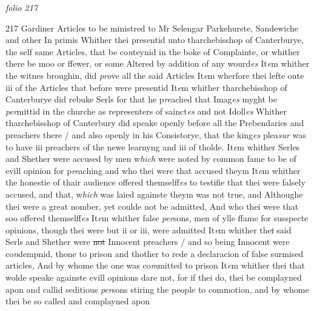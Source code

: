 \documentclass[12pt, a4paper]{book}
\begin{document}
\textit{folio 217}



{\color{Mahogany}217} Gardiner 
				\marginpar[\vspace{0.5cm}{\textcolor{Gray}{Gardiner}}]{}
			 Articles to be ministred to Mr Selengar Parkehurste, Sandewiche and other In primis Whither thei presentid unto tharchebisshop of Canterburye, the self same Articles, that be co\textit{n}teynid in the boke of Complainte, or whither there be moo or ffewer, or  some Altered by addition of any wourd\textit{es} It\textit{e}m whither the witnes broughin, did \textit{pro}ve all the said Articles It\textit{e}m wherfore thei lefte oute iii of the Articles that before were presentid It\textit{e}m whither tharchebisshop of Canterburye did rebuke Serls for that he p\textit{re}ached that Imag\textit{es} myght be \textit{per}mittid in the churche as representers of sainct\textit{es} and not Idoll\textit{es} Whither tharchebisshop of Canterbury did speake openly  before all the Prebendaries and preachers there / and also  openly in his Consistorye, that the king\textit{es} plea\textit{sur} was to have  iii preachers of the newe learnyng and iii of tholde. It\textit{e}m whither Serles and Shether were accused by men w\textit{hich} were noted by common fame to be of evill opinion for p\textit{re}aching and who thei were that accused theym It\textit{e}m whither the honestie of thair audience offered themselff\textit{es} to testifie that thei were falsely accused, and that, w\textit{hich}  was laied againste theym was not true, and Althoughe thei were a great nomber, yet coulde not be admitted, And who thei were that soo offered themselff\textit{es} It\textit{e}m whither false \textit{per}sons, men of ylle ffame for susspecte opinions, though thei were but ii or iii, were admitted It\textit{e}m whither the\sout{i}
               said Serls and Shether
			 were \sout{not} Innocent preachers / and so being Innocent were co\textit{n}dempnid, thone to prison and thother to rede a declaracion of false surmised articles, And by whome the one was co\textit{m}mitted to prison It\textit{e}m whither thei that wolde speake againste evill opinions dare not, for if thei do, thei be complayned apon and callid seditious \textit{per}sons stiring the people to commotion, and by whome thei be so called and complayned apon

\dotfill
					
\end{document}
